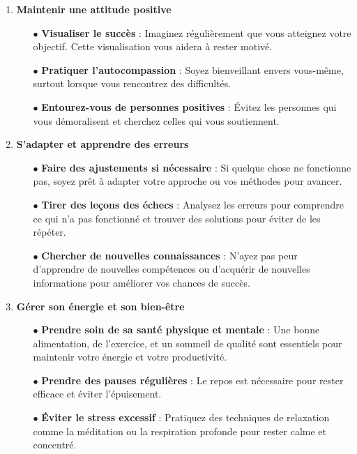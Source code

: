 \documentclass[a4paper,12pt]{article} %
\begin{document}
\begin{enumerate}[label=\textbf{\arabic*.}]
    \item \textbf{Maintenir une attitude positive}
    \begin{itemize}
        \item [$\bullet$]\textbf{Visualiser le succès} : Imaginez régulièrement que vous atteignez votre objectif. Cette visualisation vous aidera à rester motivé.
        \item [$\bullet$]\textbf{Pratiquer l'autocompassion} : Soyez bienveillant envers vous-même, surtout lorsque vous rencontrez des difficultés.
        \item [$\bullet$]\textbf{Entourez-vous de personnes positives} : Évitez les personnes qui vous démoralisent et cherchez celles qui vous soutiennent.
    \end{itemize}

    \item \textbf{S'adapter et apprendre des erreurs}
    \begin{itemize}
        \item [$\bullet$]\textbf{Faire des ajustements si nécessaire} : Si quelque chose ne fonctionne pas, soyez prêt à adapter votre approche ou vos méthodes pour avancer.
        \item [$\bullet$]\textbf{Tirer des leçons des échecs} : Analysez les erreurs pour comprendre ce qui n'a pas fonctionné et trouver des solutions pour éviter de les répéter.
        \item [$\bullet$]\textbf{Chercher de nouvelles connaissances} : N'ayez pas peur d'apprendre de nouvelles compétences ou d'acquérir de nouvelles informations pour améliorer vos chances de succès.
    \end{itemize}

    \item \textbf{Gérer son énergie et son bien-être}
    \begin{itemize}
        \item [$\bullet$]\textbf{Prendre soin de sa santé physique et mentale} : Une bonne alimentation, de l'exercice, et un sommeil de qualité sont essentiels pour maintenir votre énergie et votre productivité.
        \item [$\bullet$]\textbf{Prendre des pauses régulières} : Le repos est nécessaire pour rester efficace et éviter l'épuisement.
        \item [$\bullet$]\textbf{Éviter le stress excessif} : Pratiquez des techniques de relaxation comme la méditation ou la respiration profonde pour rester calme et concentré.
    \end{itemize}


\end{enumerate}
\end{document}
